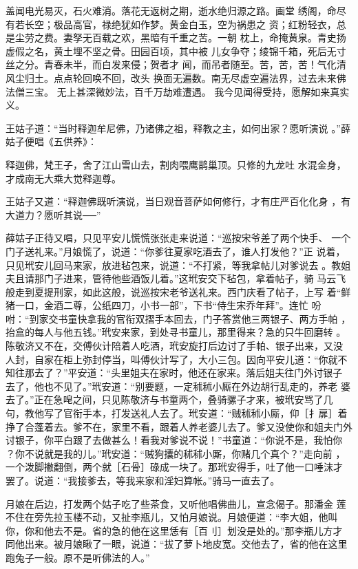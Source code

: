 盖闻电光易灭，石火难消。落花无返树之期，逝水绝归源之路。画堂
绣阁，命尽有若长空；极品高官，禄绝犹如作梦。黄金白玉，空为祸患之
资；红粉轻衣，总是尘劳之费。妻孥无百载之欢，黑暗有千重之苦。一朝
枕上，命掩黄泉。青史扬虚假之名，黄土埋不坚之骨。田园百顷，其中被
儿女争夺；绫锦千箱，死后无寸丝之分。青春未半，而白发来侵；贺者才
闻，而吊者随至。苦，苦，苦！气化清风尘归土。点点轮回唤不回，改头
换面无遍数。南无尽虚空遍法界，过去未来佛法僧三宝。
无上甚深微妙法，百千万劫难遭遇。
我今见闻得受持，愿解如来真实义。

王姑子道：“当时释迦牟尼佛，乃诸佛之祖，释教之主，如何出家？愿听演说
。”薛姑子便唱《五供养》：

释迦佛，梵王子，舍了江山雪山去，割肉喂鹰鹊巢顶。只修的九龙吐
水混金身，才成南无大乘大觉释迦尊。

王姑子又道：“释迦佛既听演说，当日观音菩萨如何修行，才有庄严百化化身
，有大道力？愿听其说──”

薛姑子正待又唱，只见平安儿慌慌张张走来说道：“巡按宋爷差了两个快手、
一个门子送礼来。”月娘慌了，说道：“你爹往夏家吃酒去了，谁人打发他？”正
说着，只见玳安儿回马来家，放进毡包来，说道：“不打紧，等我拿帖儿对爹说去
。教姐夫且请那门子进来，管待他些酒饭儿着。”这玳安交下毡包，拿着帖子，骑
马云飞般走到夏提刑家，如此这般，说巡按宋老爷送礼来。西门庆看了帖子，上写
着“鲜猪一口，金酒二尊，公纸四刀，小书一部”，下书“侍生宋乔年拜”。连忙
吩咐：“到家交书童快拿我的官衔双摺手本回去，门子答赏他三两银子、两方手帕
，抬盒的每人与他五钱。”玳安来家，到处寻书童儿，那里得来？急的只牛回磨转
。陈敬济又不在，交傅伙计陪着人吃酒，玳安旋打后边讨了手帕、银子出来，又没
人封，自家在柜上弥封停当，叫傅伙计写了，大小三包。因向平安儿道：“你就不
知往那去了？”平安道：“头里姐夫在家时，他还在家来。落后姐夫往门外讨银子
去了，他也不见了。”玳安道：“别要题，一定秫秫小厮在外边胡行乱走的，养老
婆去了。”正在急唣之间，只见陈敬济与书童两个，叠骑骡子才来，被玳安骂了几
句，教他写了官衔手本，打发送礼人去了。玳安道：“贼秫秫小厮，仰［扌扉］着
挣了合蓬着去。爹不在，家里不看，跟着人养老婆儿去了。爹又没使你和姐夫门外
讨银子，你平白跟了去做甚么！看我对爹说不说！”书童道：“你说不是，我怕你
？你不说就是我的儿。”玳安道：“贼狗攮的秫秫小厮，你赌几个真个？”走向前
，一个泼脚撇翻倒，两个就［石骨］碌成一块了。那玳安得手，吐了他一口唾沫才
罢了。说道：“我接爹去，等我来家和淫妇算帐。”骑马一直去了。

月娘在后边，打发两个姑子吃了些茶食，又听他唱佛曲儿，宣念偈子。那潘金
莲不住在旁先拉玉楼不动，又扯李瓶儿，又怕月娘说。月娘便道：“李大姐，他叫
你，你和他去不是。省的急的他在这里恁有［百刂］划没是处的。”那李瓶儿方才
同他出来。被月娘瞅了一眼，说道：“拔了萝卜地皮宽。交他去了，省的他在这里
跑兔子一般。原不是听佛法的人。”

